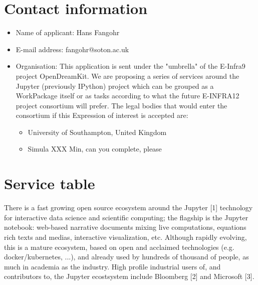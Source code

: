 \section{Contact information}
\begin{itemize}
\item Name of applicant: Hans Fangohr
\item E-mail address: fangohr@soton.ac.uk
  \item Organisation: This application is sent under the "umbrella" of the
E-Infra9 project OpenDreamKit. We are proposing a series of services
around the Jupyter (previously IPython) project which can be grouped
as a WorkPackage itself or as tasks according to what the future
E-INFRA12 project consortium will prefer. The legal bodies that would
enter the consortium if this Expression of interest is accepted are:
\begin{itemize}
\item University of Southampton, United Kingdom
\item Simula XXX Min, can you complete, please
\end{itemize}
\end{itemize}


\section{Service table}

There is a fast growing open source ecosystem around the
Jupyter [1] technology for interactive data science and scientific computing;
the flagship is the Jupyter notebook: web-based narrative documents mixing live
computations, equations rich texts and medias, interactive visualization, etc.
Although rapidly evolving, this is a mature ecosystem, based on open
and acclaimed technologies (e.g. docker/kubernetes, ...), and already used
by hundreds of thousand of people, as much in academia as the industry.
High profile industrial users of, and contributors to, the Jupyter ecostsystem
include Bloomberg [2] and Microsoft [3].

